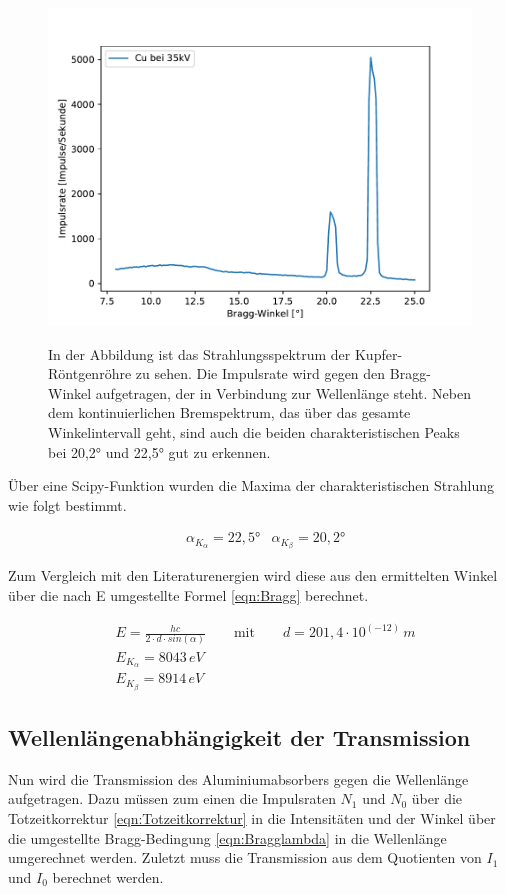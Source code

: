 \documentclass[titlepage = firstcover]{scrartcl}
\begin{document}
        \FloatBarrier
        \begin{figure}[h]
            \centering
            \caption{In der Abbildung ist das Strahlungsspektrum der Kupfer-Röntgenröhre zu sehen. Die Impulsrate wird gegen den Bragg-Winkel aufgetragen, der in Verbindung zur Wellenlänge steht. Neben dem kontinuierlichen Bremspektrum, das über das gesamte Winkelintervall geht, sind auch die beiden charakteristischen Peaks bei 20,2° und 22,5° gut zu erkennen.}
            \includegraphics[width = 0.9\linewidth]{Spektrum_Cu.pdf}
            \label{fig:Spektrum}
        \end{figure}
        \FloatBarrier

        Über eine Scipy-Funktion wurden die Maxima der charakteristischen Strahlung wie folgt bestimmt.

        \begin{align}
            &\alpha_{K_{\alpha}} = 22,5°
            &\alpha_{K_{\beta}}  = 20,2°
        \end{align}

        \noindent
        Zum Vergleich mit den Literaturenergien wird diese aus den ermittelten Winkel über die nach E umgestellte Formel \ref{eqn:Bragg} berechnet.

        \begin{align}
            &E = \frac{hc}{2 \cdot d \cdot sin(\alpha)} \qquad \text{mit} \qquad d=201,4\cdot 10^{\left(-12\right)} \, m\\
            &E_{K_{\alpha}} = 8043 \, eV \\
            &E_{K_{\beta}}  = 8914 \, eV
        \end{align}

        \subsection{Wellenlängenabhängigkeit der Transmission}
        \noindent
        Nun wird die Transmission des Aluminiumabsorbers gegen die Wellenlänge aufgetragen. Dazu müssen zum einen die Impulsraten $N_1$ und $N_0$ über die 
        Totzeitkorrektur \ref{eqn:Totzeitkorrektur} in die Intensitäten und der Winkel über die umgestellte Bragg-Bedingung \ref{eqn:Bragglambda} in die 
        Wellenlänge umgerechnet werden. Zuletzt muss die Transmission aus dem Quotienten von  $I_1$ und $I_0$ berechnet werden.
\end{document}
